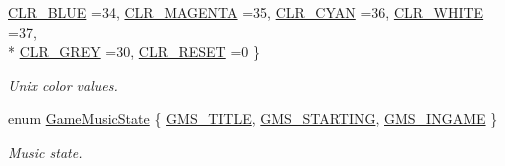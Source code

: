 \begin{DoxyCompactItemize}
\hyperlink{namespace_chase_game_a5acdf639e912d1e78814b7fae21afc7ba206cb9e67be830b771bbf44488c40d66}{C\-L\-R\-\_\-\-B\-L\-U\-E} =34, 
\hyperlink{namespace_chase_game_a5acdf639e912d1e78814b7fae21afc7ba6ce8de58df1a149d734ebcdbf711fed9}{C\-L\-R\-\_\-\-M\-A\-G\-E\-N\-T\-A} =35, 
\hyperlink{namespace_chase_game_a5acdf639e912d1e78814b7fae21afc7baa190fadb3645da6bca096b377cda2542}{C\-L\-R\-\_\-\-C\-Y\-A\-N} =36, 
\hyperlink{namespace_chase_game_a5acdf639e912d1e78814b7fae21afc7baefa8ce8fa562fcb596842176d5b1222d}{C\-L\-R\-\_\-\-W\-H\-I\-T\-E} =37, 
\\*
\hyperlink{namespace_chase_game_a5acdf639e912d1e78814b7fae21afc7ba1d11a3c17a5e12280a482d5d39c12f09}{C\-L\-R\-\_\-\-G\-R\-E\-Y} =30, 
\hyperlink{namespace_chase_game_a5acdf639e912d1e78814b7fae21afc7bab062e50df9f6e90f6c4cce85d5d420df}{C\-L\-R\-\_\-\-R\-E\-S\-E\-T} =0
 \}
\begin{DoxyCompactList}\small\item\em Unix color values. \end{DoxyCompactList}\item 
enum \hyperlink{namespace_chase_game_a85936e0bdb5509ede7ebb2543de5be42}{Game\-Music\-State} \{ \hyperlink{namespace_chase_game_a85936e0bdb5509ede7ebb2543de5be42ae2cef0894718493a1e334a948734fe65}{G\-M\-S\-\_\-\-T\-I\-T\-L\-E}, 
\hyperlink{namespace_chase_game_a85936e0bdb5509ede7ebb2543de5be42a9c9cc6c997ce9d50efd2f3d815323b11}{G\-M\-S\-\_\-\-S\-T\-A\-R\-T\-I\-N\-G}, 
\hyperlink{namespace_chase_game_a85936e0bdb5509ede7ebb2543de5be42a575913ea08f1bd0667c644624b56102f}{G\-M\-S\-\_\-\-I\-N\-G\-A\-M\-E}
 \}
\begin{DoxyCompactList}\small\item\em Music state. \end{DoxyCompactList}\end{DoxyCompactItemize}
